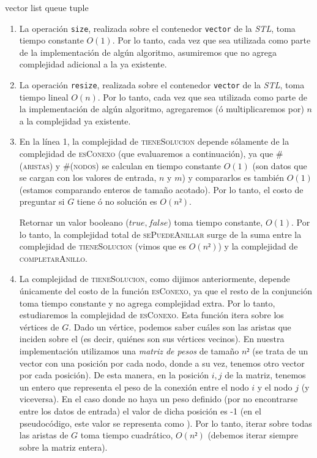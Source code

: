 vector
list
queue
tuple

\begin{enumerate}
  \item La operación \verb|size|, realizada sobre el contenedor \verb|vector| de la
  \textit{STL}, toma tiempo constante $O(1)$. Por lo tanto, cada vez que sea utilizada
  como parte de la implementación de algún algoritmo, asumiremos que no agrega complejidad
  adicional a la ya existente.

  \item La operación \verb|resize|, realizada sobre el contenedor \verb|vector| de la
  \textit{STL}, toma tiempo lineal $O(n)$. Por lo tanto, cada vez que sea utilizada
  como parte de la implementación de algún algoritmo, agregaremos (ó multiplicaremos por)
  $n$ a la complejidad ya existente.

  \item En la línea 1, la complejidad de \textsc{tieneSolucion} depende sólamente de
  la complejidad de \textsc{esConexo} (que evaluaremos a continuación), ya que
  \textsc{\#(aristas)} y \textsc{\#(nodos)} se calculan en tiempo constante $O(1)$
  (son datos que se cargan con los valores de entrada, $n$ y $m$) y compararlos es
  también $O(1)$ (estamos comparando enteros de tamaño acotado).
  Por lo tanto, el costo de preguntar si $G$ tiene ó no solución es $O(n²)$.

  Retornar un valor booleano ($true, false$) toma tiempo constante, $O(1)$. Por lo tanto,
  la complejidad total de \textsc{sePuedeAnillar} surge de la suma entre la complejidad de
  \textsc{tieneSolucion} (vimos que es $O(n²)$) y la complejidad de \textsc{completarAnillo}.

  \item La complejidad de \textsc{tieneSolucion}, como dijimos anteriormente, depende
  únicamente del costo de la función \textsc{esConexo}, ya que el resto de la conjunción
  toma tiempo constante y no agrega complejidad extra. Por lo tanto, estudiaremos la
  complejidad de \textsc{esConexo}. Esta función itera sobre los vértices de $G$.
  Dado un vértice, podemos saber cuáles son las aristas que inciden sobre el (es decir,
  quiénes son sus vértices vecinos). En nuestra implementación utilizamos una \textit{matriz de
  pesos} de tamaño $n²$ (se trata de un vector con una posición por cada nodo, donde a su vez,
  tenemos otro vector por cada posición). De esta manera, en la posición $i,j$ de la matriz,
  tenemos un entero que representa el peso de la conexión entre el nodo $i$ y el nodo $j$ (y viceversa).
  En el caso donde no haya un peso definido (por no encontrarse entre los datos de entrada) el valor
  de dicha posición es -1 (en el pseudocódigo, este valor se representa como \infty).
  Por lo tanto, iterar sobre todas las aristas de $G$ toma tiempo
  cuadrático, $O(n²)$ (debemos iterar siempre sobre la matriz entera).


\end{enumerate}

